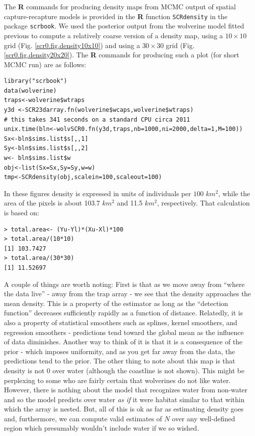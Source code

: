 The {\bf R} commands for producing density maps from MCMC output of
spatial capture-recapture models is provided in the {\bf R} function
\mbox{\tt SCRdensity} in the package \mbox{\tt scrbook}. 
We used the posterior output from the wolverine model fitted previous
to compute a relatively coarse version of a density map, using a $10 \times
10$ grid (Fig. \ref{scr0.fig.density10x10}) and using a $30 \times 30$
grid (Fig. \ref{scr0.fig.density20x20}). The {\bf R} commands for
producing such a plot (for short MCMC run) are as follows:
{\small
\begin{verbatim}
library("scrbook")
data(wolverine)
traps<-wolverine$wtraps
y3d <-SCR23darray.fn(wolverine$wcaps,wolverine$wtraps)
# this takes 341 seconds on a standard CPU circa 2011
unix.time(bln<-wolvSCR0.fn(y3d,traps,nb=1000,ni=2000,delta=1,M=100))
Sx<-bln$sims.list$s[,,1]
Sy<-bln$sims.list$s[,,2]
w<- bln$sims.list$w
obj<-list(Sx=Sx,Sy=Sy,w=w)
tmp<-SCRdensity(obj,scalein=100,scaleout=100)
\end{verbatim}
In these figures density is
expressed in units of individuals per $100$ $km^2$, while the area of
the pixels is about 103.7 $km^2$ and 11.5 $km^2$, respectively. That
calculation is based on:
\begin{verbatim}
> total.area<- (Yu-Yl)*(Xu-Xl)*100
> total.area/(10*10)
[1] 103.7427
> total.area/(30*30)
[1] 11.52697
\end{verbatim}

A couple of things are worth noting: First is that as we move away
from ``where the data live'' - away from the trap array - we see that
the density approaches the mean density. This is a property of the
estimator as long as the ``detection function'' decreases sufficiently
rapidly as a function of distance.
Relatedly, it is also a property of statistical smoothers
such as splines, kernel smoothers, and regression smoothers -
predictions tend toward the global mean as the influence of data
diminishes. Another way to think of it is that it is a consequence of
the prior - which imposes uniformity, and as you get far away from the
data, the predictions tend to the prior. The other thing to note about
this map is that density is not $0$ over water (although the coastline
is not shown). This might be perplexing
to some who are fairly certain that wolverines do not like
water. However, there is nothing about the model that recognizes water
from non-water and so the model predicts over water {\it as if} it
were habitat similar to that within which the array is nested. But,
all of this is ok as far as estimating density goes and, furthermore,
we can compute valid estimates of $N$ over any well-defined region which
presumably wouldn't include water if we so wished.

}
